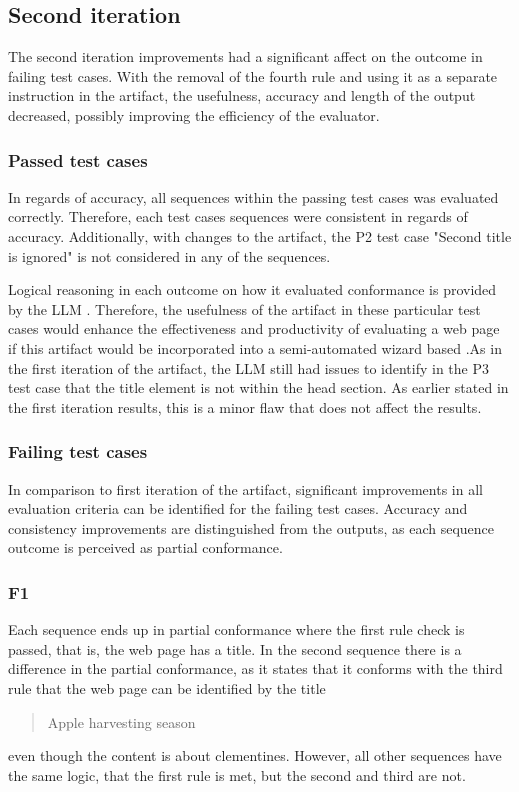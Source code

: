 \subsection{Second iteration}

The second iteration improvements had a significant affect on the outcome in failing test cases. With the removal of the fourth rule and using it as a separate instruction in the artifact, the usefulness, accuracy and length of the output decreased, possibly improving the efficiency of the evaluator.

\subsubsection{Passed test cases}

In regards of accuracy, all sequences within the passing test cases was evaluated correctly. Therefore, each test cases sequences were consistent in regards of accuracy. Additionally‚ with changes to the artifact, the P2 test case "Second title is ignored" is not considered in any of the sequences. 

Logical reasoning in each outcome on how it evaluated conformance is provided by the LLM . Therefore, the usefulness of the artifact in these particular test cases would enhance the effectiveness and productivity of evaluating a web page if this artifact would be incorporated into a semi-automated wizard based .As in the first iteration of the artifact, the LLM still had issues to identify in the P3 test case that the title element is not within the head section. As earlier stated in the first iteration results, this is a minor flaw that does not affect the results.

\subsubsection{Failing test cases}

In comparison to first iteration of the artifact, significant improvements in all evaluation criteria can be identified for the failing test cases. Accuracy and consistency improvements are distinguished from the outputs, as each sequence outcome is perceived as partial conformance. 

\subsubsection{F1}

Each sequence ends up in partial conformance where the first rule check is passed, that is, the web page has a title. In the second sequence there is a difference in the partial conformance, as it states that it conforms with the third rule that the web page can be identified by the title \blockquote{Apple harvesting season} even though the content is about clementines. However, all other sequences have the same logic, that the first rule is met, but the second and third are not.

